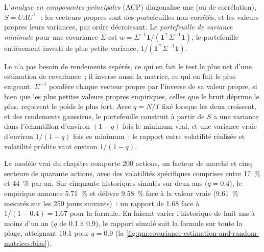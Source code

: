 \begin{definition}\label{def:qm:covariance-estimation-and-random-matrices:pca}
L'\emph{analyse en composantes principales} (ACP) diagonalise une  (ou de corrélation), $S = U\Lambda U^\top$~: les vecteurs propres sont
des portefeuilles non corrélés, et les valeurs propres leurs variances, par ordre décroissant. Le \emph{portefeuille de variance minimale} pour une
covariance $\Sigma$ est $w = \Sigma^{-1}\mathbf 1/(\mathbf 1^\top\Sigma^{-1}\mathbf 1)$, le portefeuille entièrement investi de plus petite variance, $1/(\mathbf 1^\top\Sigma^{-1}\mathbf 1)$.
\end{definition}

Le  n'a pas besoin de rendements espérés, ce qui en fait le test le plus net d'une estimation de covariance~; il inverse aussi la matrice, ce qui en fait le plus
exigeant. $\Sigma^{-1}$ pondère chaque vecteur propre par l'inverse de sa valeur propre, si bien que les plus petites valeurs propres empiriques, celles que le bruit déprime
le plus, reçoivent le poids le plus fort. Avec $q = N/T$ fixé lorsque les deux croissent, et des rendements gaussiens, le portefeuille construit à partir de $S$ a une variance dans l'échantillon d'environ $(1 - q)$
fois le minimum vrai, et une variance vraie d'environ $1/(1 - q)$ fois ce minimum~: le rapport entre volatilité réalisée et volatilité prédite vaut environ $1/(1 - q)$.

Le modèle vrai du chapitre comporte 200 actions, un facteur de marché et cinq secteurs de quarante actions, avec des volatilités spécifiques comprises entre 17~\% et 44~\% par an. Sur cinquante
historiques simulés sur deux ans ($q = 0.4$), le  empirique annonce 5.71~\% et délivre 9.58~\% face à la valeur vraie (9.61~\% mesurés sur les 250
jours suivants)~: un rapport de 1.68 face à $1/(1 - 0.4) = 1.67$ pour la formule. En faisant varier l'historique de huit ans à moins d'un an ($q$ de 0.1 à 0.9), le rapport simulé suit
la formule sur toute la plage, atteignant 10.1 pour $q = 0.9$ (la \cref{fig:qm:covariance-estimation-and-random-matrices:bias}).

